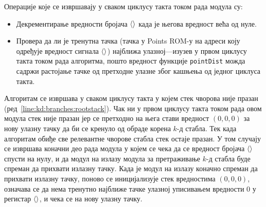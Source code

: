\documentclass[master]{finthesis}
\newcommand*{\kd}{\texorpdfstring{$k$}{k}-д }
\newcommand*{\correctmath}[1]{%
    \ifcsname mathCorrectionFor#1\endcsname%
        \csname mathCorrectionFor#1\endcsname%
    \else%
        #1%
    \fi%
}
\newcommand*{\mfield}[1]{{\langle\correctmath{#1}\/\rangle}}
\newcommand*{\field}[1]{\texorpdfstring{$\mfield{#1}$}{⟨#1⟩}}
\newcommand*{\prog}[1]{\texttt{#1}}
\newcommand*{\func}[1]{\prog{#1}}
\begin{document}
Операције које се извршавају у сваком циклусу такта током рада модула су:
\begin{itemize}
    \item Декрементирање вредности бројача \field{closestPointDelay} када је његова вредност већа од нуле.
    \item Провера да ли је тренутна тачка (тачка у Points ROM-у на адреси коју одређује вредност сигнала \field{addrPRom}) најближа улазној---изузев у првом циклусу такта током рада алгоритма, пошто вредност функције \func{pointDist} можда садржи растојање тачке од претходне улазне због кашњења од једног циклуса такта.
\end{itemize}

Алгоритам се извршава у сваком циклусу такта у којем стек чворова није празан (ред~\ref{line:kd:branches:rootstack}). Чак ни у првом циклусу такта током рада овом модула стек није празан јер се претходно на њега стави вредност $(0, 0, 0)$ за нову улазну тачку да би се кренуло од обраде корена \kd стабла. Тек када алгоритам обиђе све релевантне чворове стабла стек остаје празан. У том случају се извршава коначни део рада модула у којем се чека да се вредност бројача \field{closestPointDelay} спусти на нулу, и да модул на излазу модула за претраживање \kd стабла буде спреман да прихвати излазну тачку. Када је модул на излазу коначно спреман да прихвати излазну тачку, поново се иницијализује стек вредностима $(0, 0, 0)$, означава се да нема тренутно најближе тачке улазној уписивањем вредности $0$ у регистар \field{closestPointAssigned}, и чека се на нову улазну тачку.
\end{document}
